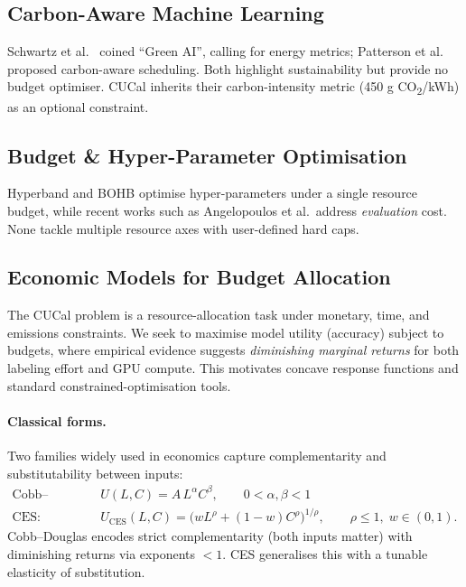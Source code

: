 \documentclass[11pt]{article}
\begin{document}
\subsection{Carbon-Aware Machine Learning}
Schwartz et al.~\citeyearpar{Schwartz2020} coined “Green AI”, calling for
energy metrics; Patterson et al.~\citeyearpar{Patterson2022} proposed
carbon-aware scheduling.  Both highlight sustainability but provide no
budget optimiser.  CUCal inherits their carbon-intensity metric
(450 g CO\textsubscript{2}/kWh) as an optional constraint.

\subsection{Budget \& Hyper-Parameter Optimisation}
Hyperband \citep{Li2017hyperband} and BOHB \citep{Falkner2018bohb}
optimise hyper-parameters under a single resource budget, while recent
works such as Angelopoulos et al.\ address \emph{evaluation} cost.
None tackle multiple resource axes with user-defined hard caps.

\subsection{Economic Models for Budget Allocation}

The CUCal problem is a resource-allocation task under monetary, time, and emissions constraints. We seek to maximise model utility (accuracy) subject to budgets, where empirical evidence suggests \emph{diminishing marginal returns} for both labeling effort and GPU compute. This motivates concave response functions and standard constrained-optimisation tools.

\paragraph{Classical forms.}
Two families widely used in economics capture complementarity and substitutability between inputs:
\begin{align*}
\text{Cobb--Douglas:}\quad
&U(L,C) = A\, L^{\alpha} C^{\beta}, \qquad 0<\alpha,\beta<1 \\
\text{CES:}\quad
&U_{\mathrm{CES}}(L,C) = \bigl(w L^{\rho} + (1-w) C^{\rho}\bigr)^{1/\rho}, \qquad \rho \le 1,\; w\in(0,1).
\end{align*}
Cobb--Douglas encodes strict complementarity (both inputs matter) with diminishing returns via exponents $<1$. CES generalises this with a tunable elasticity of substitution.
\end{document}
